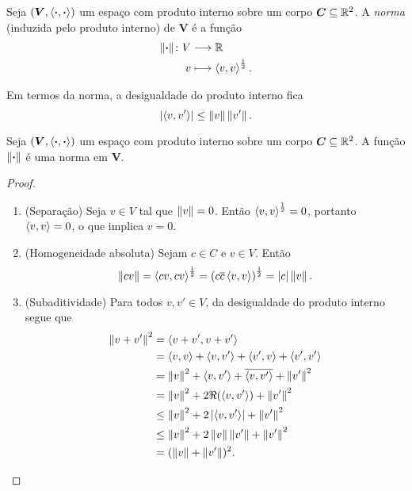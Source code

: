 \begin{definition}
Seja $(\bm V,\inte{\var}{\var})$ um espaço com produto interno sobre um corpo $\bm C \subseteq \R^2$. A \emph{norma} (induzida pelo produto interno) de $\bm V$ é a função
	\begin{align*}
	\func{\nor{\var}}{V}{\R}{v}{\inte{v}{v}^{\frac{1}{2}}}.
	\end{align*}
\end{definition}

Em termos da norma, a desigualdade do produto interno fica
	\begin{equation*}
	\abs{\inte{v}{v'}} \leq \nor{v}\nor{v'}.
	\end{equation*}

\begin{proposition}
Seja $(\bm V,\inte{\var}{\var})$ um espaço com produto interno sobre um corpo $\bm C \subseteq \R^2$. A função $\nor{\var}$ é uma norma em $\bm V$.
\end{proposition}
\begin{proof}
	\begin{enumerate}
	\item (Separação) Seja $v \in V$ tal que $\nor{v}=0$. Então $\inte{v}{v}^\frac{1}{2}=0$, portanto $\inte{v}{v}=0$, o que implica $v=0$.

	\item (Homogeneidade absoluta) Sejam $c \in C$ e $v \in V$. Então
	\begin{equation*}
	\nor{cv} = \inte{cv}{cv}^{\frac{1}{2}} = \left(c\conju{c}\inte{v}{v}\right)^{\frac{1}{2}} = \abs{c}\nor{v}.
	\end{equation*}
	
	\item (Subaditividade) Para todos $v,v' \in V$, da desigualdade do produto interno segue que
	\begin{align*}
	\nor{v+v'}^2 &= \inte{v+v'}{v+v'} \\
		&= \inte{v}{v}+\inte{v}{v'}+\inte{v'}{v}+\inte{v'}{v'} \\
		&=  \nor{v}^2+\inte{v}{v'}+\conju{\inte{v}{v'}}+\nor{v'}^2\\
		&= \nor{v}^2+2\Re(\inte{v}{v'})+\nor{v'}^2\\
		&\leq \nor{v}^2+2\abs{\inte{v}{v'}}+\nor{v'}^2\\
		&\leq \nor{v}^2 + 2\nor{v}\nor{v'}+\nor{v'}^2 \\
		&= (\nor{v} + \nor{v'})^2.
		\qedhere
	\end{align*}
	\end{enumerate}
\end{proof}

